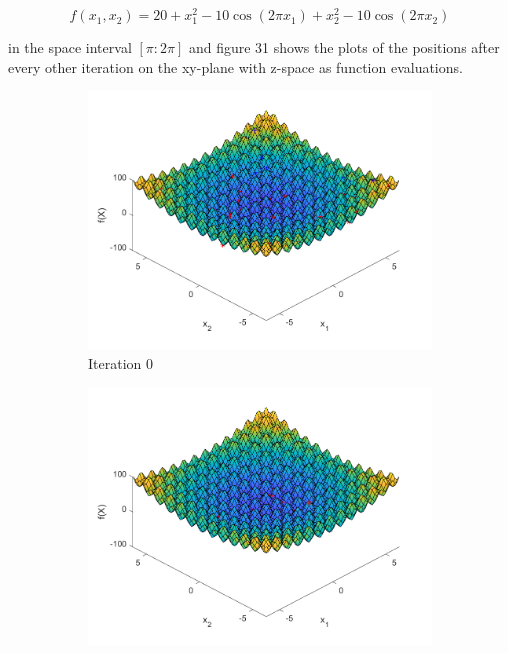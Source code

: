 $$
  f(x_1, x_2) = 20 + x_1^2 - 10 \cos(2\pi x_1) + x_2^2 - 10 \cos(2\pi x_2)
$$

in the space interval $[\pi:2\pi]$ and figure 31 shows the plots of the positions after every other iteration on the xy-plane with z-space as function evaluations.

\begin{figure}
  \centering
  \begin{subfigure}[b]{0.4\textwidth}
    \includegraphics[width=\textwidth]{img/smpl/rast2d/loa-iter-0}
    \caption{Iteration 0}
    \label{fig:s4-iter-0}
  \end{subfigure}
  \begin{subfigure}[b]{0.4\textwidth}
    \includegraphics[width=\textwidth]{img/smpl/rast2d/loa-iter-7}

\end{subfigure}
\end{figure}
